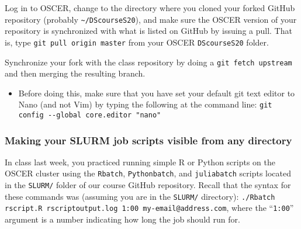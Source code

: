 \documentclass[12pt,english]{exam}
\begin{document}
\begin{questions}
\question Log in to OSCER, change to the directory where you cloned your forked GitHub repository (probably \texttt{\textasciitilde/DScourseS20}), and make sure the OSCER version of your repository is synchronized with what is listed on GitHub by issuing a pull. That is, type \texttt{git pull origin master} from your OSCER \texttt{DScourseS20} folder. 

\question Synchronize your fork with the class repository by doing a \texttt{git fetch upstream} and then merging the resulting branch. 
\begin{itemize}
	\item Before doing this, make sure that you have set your default git text editor to Nano (and not Vim) by typing the following at the command line: \texttt{git config -{}-global core.editor "nano"}
\end{itemize}

\subsubsection*{Making your SLURM job scripts visible from any directory}

\question In class last week, you practiced running simple R or Python scripts on the OSCER cluster using the \texttt{Rbatch}, \texttt{Pythonbatch}, and \texttt{juliabatch} scripts located in the \texttt{SLURM/} folder of our course GitHub repository. Recall that the syntax for these commands was (assuming you are in the \texttt{SLURM/} directory): \texttt{./Rbatch rscript.R rscriptoutput.log 1:00 my-email@address.com}, where the ``\texttt{1:00}'' argument is a number indicating how long the job should run for.


\end{questions}
\end{document}
